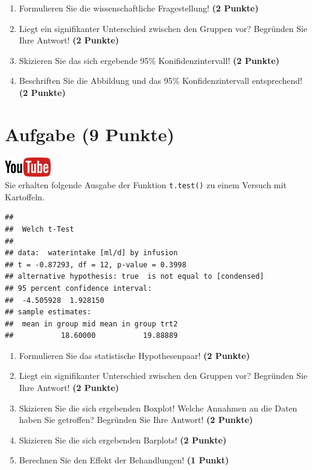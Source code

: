 \documentclass[a4paper, 9pt]{scrartcl}\usepackage[]{graphicx}\usepackage[]{xcolor}
\makeatletter
\newenvironment{kframe}{%
 \def\at@end@of@kframe{}%
 \ifinner\ifhmode%
  \def\at@end@of@kframe{\end{minipage}}%
  \begin{minipage}{\columnwidth}%
 \fi\fi%
 \def\FrameCommand##1{\hskip\@totalleftmargin \hskip-\fboxsep
 \colorbox{shadecolor}{##1}\hskip-\fboxsep
     \hskip-\linewidth \hskip-\@totalleftmargin \hskip\columnwidth}%
 \MakeFramed {\advance\hsize-\width
   \@totalleftmargin\z@ \linewidth\hsize
   \@setminipage}}%
 {\par\unskip\endMakeFramed%
 \at@end@of@kframe}
\newenvironment{knitrout}{}{} %
\makeatother
\begin{document}
\begin{enumerate}
  \item Formulieren Sie die wissenschaftliche Fragestellung! \textbf{(2
Punkte)}
\item Liegt ein signifikanter Unterschied zwischen den Gruppen vor?
  Begr{\"u}nden Sie Ihre Antwort! \textbf{(2 Punkte)}
\item Skizieren Sie das sich ergebende 95\% Konifidenzintervall! \textbf{(2 Punkte)}
\item Beschriften Sie die Abbildung und
  das 95\% Konfidenzintervall entsprechend! \textbf{(2 Punkte)}  
\end{enumerate} 
\clearpage

\section{Aufgabe \hfill (9 Punkte)}

\hfill\href{https://youtu.be/w62HJlbN28U}{\includegraphics[width =
  2cm]{img/youtube}}\\[1Ex]



Sie erhalten folgende \Rlogo Ausgabe der Funktion \texttt{t.test()} zu einem Versuch mit Kartoffeln.

\begin{knitrout}
\color{fgcolor}\begin{kframe}
\begin{verbatim}
## 
## 	Welch t-Test
## 
## data:  waterintake [ml/d] by infusion
## t = -0.87293, df = 12, p-value = 0.3998
## alternative hypothesis: true  is not equal to [condensed]
## 95 percent confidence interval:
##  -4.505928  1.928150
## sample estimates:
##  mean in group mid mean in group trt2 
##           18.60000           19.88889
\end{verbatim}
\end{kframe}
\end{knitrout}


\begin{enumerate}
  \item Formulieren Sie das statistische Hypothesenpaar! \textbf{(2
Punkte)}
\item Liegt ein signifikanter Unterschied zwischen den Gruppen vor?
  Begr{\"u}nden Sie Ihre Antwort! \textbf{(2 Punkte)}
\item Skizieren Sie die sich ergebenden Boxplot!
  Welche Annahmen an die Daten haben Sie getroffen? Begr{\"u}nden Sie Ihre
  Antwort! \textbf{(2 Punkte)} 
\item Skizieren Sie die sich ergebenden Barplots! \textbf{(2 Punkte)}
\item Berechnen Sie den Effekt der Behandlungen! \textbf{(1 Punkt)} 
\end{enumerate}
 
\end{document}

